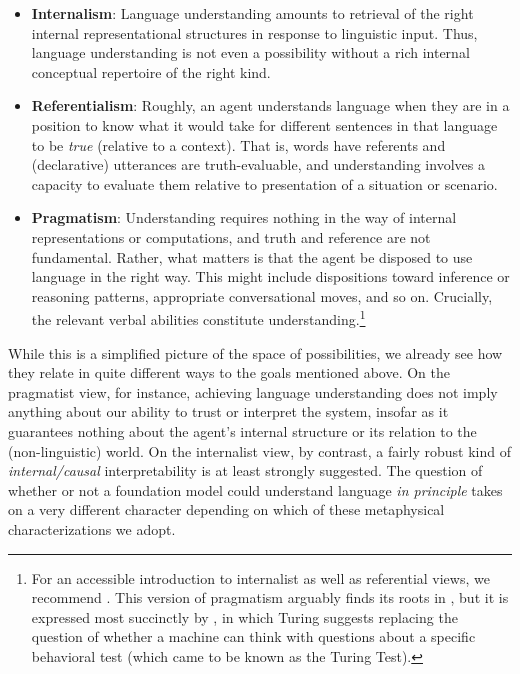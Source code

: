 \begin{itemize}
    \item \textbf{Internalism}: Language understanding amounts to retrieval of the right internal representational structures in response to linguistic input. Thus, language understanding is not even a possibility without a rich internal conceptual repertoire of the right kind.
    \item \textbf{Referentialism}: Roughly, an agent understands language when they are in a position to know what it would take for different sentences in that language to be \textit{true} (relative to a context). That is, words have referents and (declarative) utterances are truth-evaluable, and understanding involves a capacity to evaluate them relative to presentation of a situation or scenario.
    \item \textbf{Pragmatism}: Understanding requires nothing in the way of internal representations or computations, and truth and reference are not fundamental. Rather, what matters is that the agent be disposed to use language in the right way. This might include dispositions toward inference or reasoning patterns, appropriate conversational moves, and so on. Crucially, the relevant verbal abilities constitute understanding.\footnote{For an accessible introduction to internalist as well as referential views, we recommend \citet{elbourne2011meaning}. This version of pragmatism arguably finds its roots in \citet{wittgenstein1953philosophical}, but it is expressed most succinctly by \citet{turing1950computing}, in which Turing suggests replacing the question of whether a machine can think with questions about a specific behavioral test (which came to be known as the Turing Test).}
\end{itemize}

While this is a simplified picture of the space of possibilities, we already see how they relate in quite different ways to the goals mentioned above. On the pragmatist view, for instance, achieving language understanding does not imply anything about our ability to trust or interpret the system, insofar as it guarantees nothing about the agent’s internal structure or its relation to the (non-linguistic) world. On the internalist view, by contrast, a fairly robust kind of \textit{internal/causal} interpretability is at least strongly suggested. The question of whether or not a foundation model could understand language \textit{in principle} takes on a very different character depending on which of these metaphysical characterizations we adopt.

